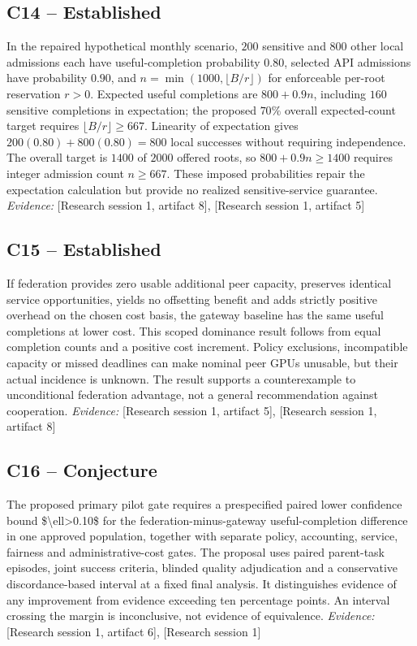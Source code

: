 \documentclass[11pt]{article}
\begin{document}
\subsection{C14 -- Established}
In the repaired hypothetical monthly scenario, $200$ sensitive and $800$ other local admissions each have useful-completion probability $0.80$, selected API admissions have probability $0.90$, and $n=\min(1000,\lfloor B/r\rfloor)$ for enforceable per-root reservation $r>0$. Expected useful completions are $800+0.9n$, including $160$ sensitive completions in expectation; the proposed $70\%$ overall expected-count target requires $\lfloor B/r\rfloor\geq667$.
Linearity of expectation gives $200(0.80)+800(0.80)=800$ local successes without requiring independence. The overall target is $1400$ of $2000$ offered roots, so $800+0.9n\geq1400$ requires integer admission count $n\geq667$. These imposed probabilities repair the expectation calculation but provide no realized sensitive-service guarantee.
\textit{Evidence: }[Research session 1, artifact 8], [Research session 1, artifact 5]
\subsection{C15 -- Established}
If federation provides zero usable additional peer capacity, preserves identical service opportunities, yields no offsetting benefit and adds strictly positive overhead on the chosen cost basis, the gateway baseline has the same useful completions at lower cost.
This scoped dominance result follows from equal completion counts and a positive cost increment. Policy exclusions, incompatible capacity or missed deadlines can make nominal peer GPUs unusable, but their actual incidence is unknown. The result supports a counterexample to unconditional federation advantage, not a general recommendation against cooperation.
\textit{Evidence: }[Research session 1, artifact 5], [Research session 1, artifact 8]
\subsection{C16 -- Conjecture}
The proposed primary pilot gate requires a prespecified paired lower confidence bound \$\textbackslash{}ell\textgreater{}0.10\$ for the federation-minus-gateway useful-completion difference in one approved population, together with separate policy, accounting, service, fairness and administrative-cost gates.
The proposal uses paired parent-task episodes, joint success criteria, blinded quality adjudication and a conservative discordance-based interval at a fixed final analysis. It distinguishes evidence of any improvement from evidence exceeding ten percentage points. An interval crossing the margin is inconclusive, not evidence of equivalence.
\textit{Evidence: }[Research session 1, artifact 6], [Research session 1]
\end{document}
